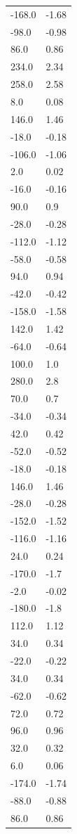 \begin{longtable}{ll}
-168.0 & -1.68 \\
-98.0 & -0.98 \\
86.0 & 0.86 \\
234.0 & 2.34 \\
258.0 & 2.58 \\
8.0 & 0.08 \\
146.0 & 1.46 \\
-18.0 & -0.18 \\
-106.0 & -1.06 \\
2.0 & 0.02 \\
-16.0 & -0.16 \\
90.0 & 0.9 \\
-28.0 & -0.28 \\
-112.0 & -1.12 \\
-58.0 & -0.58 \\
94.0 & 0.94 \\
-42.0 & -0.42 \\
-158.0 & -1.58 \\
142.0 & 1.42 \\
-64.0 & -0.64 \\
100.0 & 1.0 \\
280.0 & 2.8 \\
70.0 & 0.7 \\
-34.0 & -0.34 \\
42.0 & 0.42 \\
-52.0 & -0.52 \\
-18.0 & -0.18 \\
146.0 & 1.46 \\
-28.0 & -0.28 \\
-152.0 & -1.52 \\
-116.0 & -1.16 \\
24.0 & 0.24 \\
-170.0 & -1.7 \\
-2.0 & -0.02 \\
-180.0 & -1.8 \\
112.0 & 1.12 \\
34.0 & 0.34 \\
-22.0 & -0.22 \\
34.0 & 0.34 \\
-62.0 & -0.62 \\
72.0 & 0.72 \\
96.0 & 0.96 \\
32.0 & 0.32 \\
6.0 & 0.06 \\
-174.0 & -1.74 \\
-88.0 & -0.88 \\
86.0 & 0.86 \\

\end{longtable}
